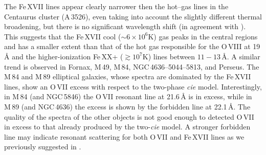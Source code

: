 \documentclass[useAMS,usenatbib]{mn2e}
\begin{document}
The Fe\,{\small XVII} lines appear clearly
narrower then the hot--gas lines in the Centaurus cluster (A\,3526),
even taking into account the slightly different thermal broadening,
but there is no significant wavelength shift 
(in agreement with \citealt{Sanders2008}).
This suggests that the Fe\,{\small XVII} cool ($\sim6\times10^6$K) 
gas peaks in the central regions
and has a smaller extent than that of the hot gas responsible 
for the {O\,{\small VIII}} at 19\,{\AA} and the higher-ionization 
Fe\,{\small XX+} ($\gtrsim10^7$K) lines between $11-13$\,{\AA}.
A similar trend is observed in Fornax, M\,49, M\,84, 
NGC\,4636--5044--5813, and Perseus.
The M\,84 and M\,89 elliptical galaxies, whose spectra are dominated 
by the Fe\,{\small XVII} lines, show an {O\,{\small VII}} excess 
with respect to the two-phase \textit{cie} model.
Interestingly, in M\,84 (and NGC\,5846) the {O\,{\small VII}} resonant 
line at 21.6\,{\AA} is in excess, 
while in M\,89 (and NGC\,4636) the excess is shown 
by the forbidden line at 22.1\,{\AA}.
The quality of the spectra of the other objects is not good enough to detected
{O\,{\small VII}} in excess to that already produced 
by the two-\textit{cie} model.
A stronger forbidden line may indicate resonant 
scattering for both {O\,{\small VII}} and Fe\,{\small XVII} 
lines as we previously suggested in \citet{Pinto2014}. 
\end{document}
